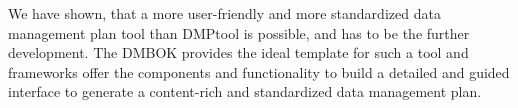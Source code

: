 We have shown, that a more user-friendly and more standardized data management plan tool than DMPtool is possible, and has to be the further development. The DMBOK provides the ideal template for such a tool and frameworks offer the components and functionality to build a detailed and guided interface to generate a content-rich and standardized data management plan.